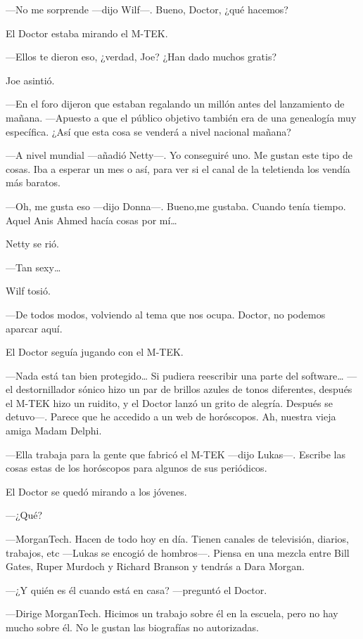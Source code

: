 ---No me sorprende ---dijo Wilf---. Bueno, Doctor, ¿qué hacemos?

El Doctor estaba mirando el M-TEK.

---Ellos te dieron eso, ¿verdad, Joe? ¿Han dado muchos gratis?

Joe asintió.

---En el foro dijeron que estaban regalando un millón antes del
lanzamiento de mañana. ---Apuesto a que el público objetivo también era
de una genealogía muy específica. ¿Así que esta cosa se venderá a nivel
nacional mañana?

---A nivel mundial ---añadió Netty---. Yo conseguiré uno. Me gustan este
tipo de cosas. Iba a esperar un mes o así, para ver si el canal de la
teletienda los vendía más baratos.

---Oh, me gusta eso ---dijo Donna---. Bueno,me gustaba. Cuando tenía
tiempo. Aquel Anis Ahmed hacía cosas por mí\ldots{}~

Netty se rió.

---Tan sexy\ldots{}

Wilf tosió.

---De todos modos, volviendo al tema que nos ocupa. Doctor, no podemos
aparcar aquí.

El Doctor seguía jugando con el M-TEK.

---Nada está tan bien protegido\ldots{} Si pudiera reescribir una parte
del software\ldots{} ---el destornillador sónico hizo un par de brillos
azules de tonos diferentes, después el M-TEK hizo un ruidito, y el
Doctor lanzó un grito de alegría. Después se detuvo---. Parece que he
accedido a un web de horóscopos. Ah, nuestra vieja amiga Madam Delphi.

---Ella trabaja para la gente que fabricó el M-TEK ---dijo Lukas---.
Escribe las cosas estas de los horóscopos para algunos de sus
periódicos.

El Doctor se quedó mirando a los jóvenes.

---¿Qué?

---MorganTech. Hacen de todo hoy en día. Tienen canales de televisión,
diarios, trabajos, etc ---Lukas se encogió de hombros---. Piensa en una
mezcla entre Bill Gates, Ruper Murdoch y Richard Branson y tendrás a
Dara Morgan.

---¿Y quién es él cuando está en casa? ---preguntó el Doctor.

---Dirige MorganTech. Hicimos un trabajo sobre él en la escuela, pero no
hay mucho sobre él. No le gustan las biografías no autorizadas.

